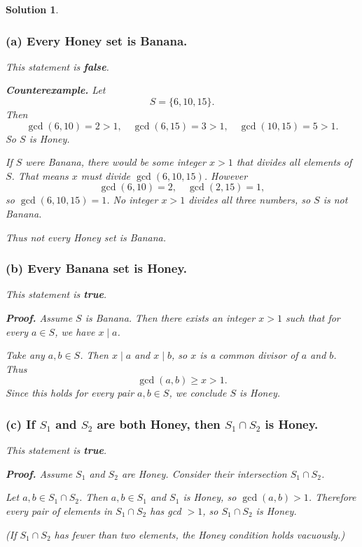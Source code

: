 \documentclass[11pt]{article}
\newtheorem*{solution}{Solution}
\begin{document}
\begin{solution}

\subsubsection*{(a) Every Honey set is Banana.}

This statement is \textbf{false}.

\medskip\noindent
\textbf{Counterexample.}
Let
\[
S = \{6,10,15\}.
\]
Then
\[
\gcd(6,10) = 2 > 1,\quad \gcd(6,15) = 3 > 1,\quad \gcd(10,15) = 5 > 1.
\]
So $S$ is Honey.

If $S$ were Banana, there would be some integer $x>1$ that divides all elements of $S$. That means $x$ must divide $\gcd(6,10,15)$. However
\[
\gcd(6,10) = 2,\quad \gcd(2,15) = 1,
\]
so $\gcd(6,10,15) = 1$. No integer $x>1$ divides all three numbers, so $S$ is not Banana.

Thus not every Honey set is Banana.

\subsubsection*{(b) Every Banana set is Honey.}

This statement is \textbf{true}.

\medskip\noindent
\textbf{Proof.}
Assume $S$ is Banana. Then there exists an integer $x>1$ such that for every $a\in S$, we have $x\mid a$.

Take any $a,b\in S$. Then $x\mid a$ and $x\mid b$, so $x$ is a common divisor of $a$ and $b$. Thus
\[
\gcd(a,b) \ge x > 1.
\]
Since this holds for every pair $a,b\in S$, we conclude $S$ is Honey.

\subsubsection*{(c) If $S_1$ and $S_2$ are both Honey, then $S_1\cap S_2$ is Honey.}

This statement is \textbf{true}.

\medskip\noindent
\textbf{Proof.}
Assume $S_1$ and $S_2$ are Honey. Consider their intersection $S_1\cap S_2$.

Let $a,b\in S_1\cap S_2$. Then $a,b\in S_1$ and $S_1$ is Honey, so $\gcd(a,b)>1$. Therefore every pair of elements in $S_1\cap S_2$ has gcd $>1$, so $S_1\cap S_2$ is Honey.

(If $S_1\cap S_2$ has fewer than two elements, the Honey condition holds vacuously.)


\end{solution}
\end{document}
